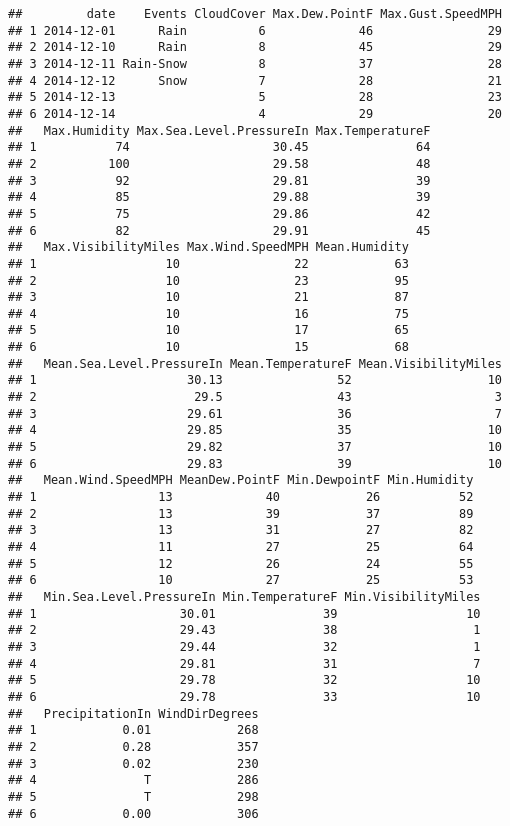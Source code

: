 \documentclass[]{article}
\begin{document}
\begin{verbatim}
##         date    Events CloudCover Max.Dew.PointF Max.Gust.SpeedMPH
## 1 2014-12-01      Rain          6             46                29
## 2 2014-12-10      Rain          8             45                29
## 3 2014-12-11 Rain-Snow          8             37                28
## 4 2014-12-12      Snow          7             28                21
## 5 2014-12-13                    5             28                23
## 6 2014-12-14                    4             29                20
##   Max.Humidity Max.Sea.Level.PressureIn Max.TemperatureF
## 1           74                    30.45               64
## 2          100                    29.58               48
## 3           92                    29.81               39
## 4           85                    29.88               39
## 5           75                    29.86               42
## 6           82                    29.91               45
##   Max.VisibilityMiles Max.Wind.SpeedMPH Mean.Humidity
## 1                  10                22            63
## 2                  10                23            95
## 3                  10                21            87
## 4                  10                16            75
## 5                  10                17            65
## 6                  10                15            68
##   Mean.Sea.Level.PressureIn Mean.TemperatureF Mean.VisibilityMiles
## 1                     30.13                52                   10
## 2                      29.5                43                    3
## 3                     29.61                36                    7
## 4                     29.85                35                   10
## 5                     29.82                37                   10
## 6                     29.83                39                   10
##   Mean.Wind.SpeedMPH MeanDew.PointF Min.DewpointF Min.Humidity
## 1                 13             40            26           52
## 2                 13             39            37           89
## 3                 13             31            27           82
## 4                 11             27            25           64
## 5                 12             26            24           55
## 6                 10             27            25           53
##   Min.Sea.Level.PressureIn Min.TemperatureF Min.VisibilityMiles
## 1                    30.01               39                  10
## 2                    29.43               38                   1
## 3                    29.44               32                   1
## 4                    29.81               31                   7
## 5                    29.78               32                  10
## 6                    29.78               33                  10
##   PrecipitationIn WindDirDegrees
## 1            0.01            268
## 2            0.28            357
## 3            0.02            230
## 4               T            286
## 5               T            298
## 6            0.00            306
\end{verbatim}
\end{document}
